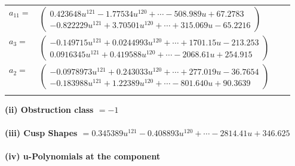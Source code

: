 \documentclass[1p]{elsarticle_modified}
\theoremstyle{definition}
\begin{document}
\begin{tabular}{m{7pt} m{180pt} m{7pt} m{180pt} }
\flushright $a_{11}=$&$\begin{pmatrix}0.423648 u^{121}-1.77534 u^{120}+\cdots-508.989 u+67.2783\\-0.822229 u^{121}+3.70501 u^{120}+\cdots+315.069 u-65.2216\end{pmatrix}$ \\
\flushright $a_{3}=$&$\begin{pmatrix}-0.149715 u^{121}+0.0244993 u^{120}+\cdots+1701.15 u-213.253\\0.0916345 u^{121}+0.419588 u^{120}+\cdots-2068.61 u+254.915\end{pmatrix}$ \\
\flushright $a_{2}=$&$\begin{pmatrix}-0.0978973 u^{121}+0.243033 u^{120}+\cdots+277.019 u-36.7654\\-0.183988 u^{121}+1.22389 u^{120}+\cdots-801.640 u+90.3639\end{pmatrix}$\\&\end{tabular}
\flushleft \textbf{(ii) Obstruction class $= -1$}\\~\\
\flushleft \textbf{(iii) Cusp Shapes $= 0.345389 u^{121}-0.408893 u^{120}+\cdots-2814.41 u+346.625$}\\~\\
\newpage\renewcommand{\arraystretch}{1}
\flushleft \textbf{(iv) u-Polynomials at the component}\newline \\
\end{document}
